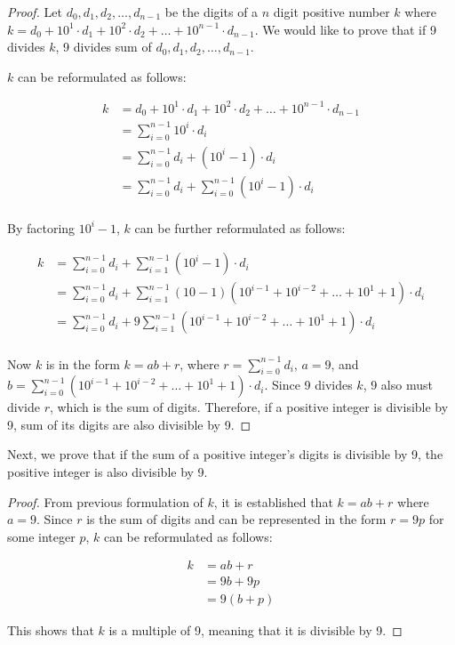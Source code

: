 \documentclass{article}
\begin{document}
\begin{proof}
	Let $d_0, d_1, d_2, \ldots, d_{n-1}$ be the digits of a $n$ digit positive number $k$ where $k = d_0 + 10^1 \cdot d_1 + 10^2 \cdot d_2 + \ldots + 10^{n-1} \cdot d_{n-1}$. We would like to prove that if 9 divides $k$, 9 divides sum of $d_0, d_1, d_2, \ldots, d_{n-1}$.

	$k$ can be reformulated as follows:

	\begin{align*}
		k & = d_0 + 10^1 \cdot d_1 + 10^2 \cdot d_2 + \ldots + 10^{n-1} \cdot d_{n-1} \\
		  & = \sum_{i=0}^{n-1}{10^i \cdot d_i}                                        \\
		  & = \sum_{i=0}^{n-1}{d_i + (10^i - 1) \cdot d_i}                            \\
		  & = \sum_{i=0}^{n-1}{d_i} + \sum_{i=0}^{n-1}{(10^i - 1) \cdot d_i}          \\
	\end{align*}

	By factoring $10^i - 1$, $k$ can be further reformulated as follows:

	\begin{align*}
		k & = \sum_{i=0}^{n-1}{d_i} + \sum_{i=1}^{n-1}{(10^i - 1) \cdot d_i}                                          \\
		  & = \sum_{i=0}^{n-1}{d_i} + \sum_{i=1}^{n-1}{(10 - 1)(10^{i-1} + 10^{i-2} + \ldots + 10^{1} + 1) \cdot d_i} \\
		  & = \sum_{i=0}^{n-1}{d_i} + 9 \sum_{i=1}^{n-1}{(10^{i-1} + 10^{i-2} + \ldots + 10^{1} + 1) \cdot d_i}       \\
	\end{align*}

	Now $k$ is in the form $k = ab + r$, where $r = \sum_{i=0}^{n-1}{d_i}$, $a = 9$, and $b = \sum_{i=0}^{n-1}{(10^{i-1} + 10^{i-2} + \ldots + 10^{1} + 1) \cdot d_i}$. Since 9 divides $k$, 9 also must divide $r$, which is the sum of digits. Therefore, if a positive integer is divisible by 9, sum of its digits are also divisible by 9.
\end{proof}

Next, we prove that if the sum of a positive integer's digits is divisible by 9, the positive integer is also divisible by 9.

\begin{proof}
	From previous formulation of $k$, it is established that $k = ab + r$ where $a = 9$. Since $r$ is the sum of digits and can be represented in the form $r = 9p$ for some integer $p$, $k$ can be reformulated as follows:

	\begin{align*}
		k & = ab + r  \\
		  & = 9b + 9p \\
		  & = 9(b+p)
	\end{align*}

	This shows that $k$ is a multiple of 9, meaning that it is divisible by 9.
\end{proof}
\end{document}
